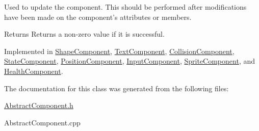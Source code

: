 Used to update the component. This should be performed after modifications have been made on the component's attributes or members.

\begin{DoxyReturn}{Returns}
Returns a non-\/zero value if it is successful. 
\end{DoxyReturn}


Implemented in \hyperlink{class_shape_component_ae62aa31a3d5c65c675243fdcc5f60904}{Shape\-Component}, \hyperlink{class_text_component_a0157702090c5ab75071448dfefb7196e}{Text\-Component}, \hyperlink{class_collision_component_a03f6ad68a39a5f7df79d5ed3e85a31eb}{Collision\-Component}, \hyperlink{class_state_component_a202841453e2d2bebc43079ec2da344bb}{State\-Component}, \hyperlink{class_position_component_a1c966c7291bcf3b8c8101bb70f046f7f}{Position\-Component}, \hyperlink{class_input_component_a1577c43e70f7e7f4ac6647fb4a8563fa}{Input\-Component}, \hyperlink{class_sprite_component_a3518ccb69a3c829d5dcdc2dc024447ea}{Sprite\-Component}, and \hyperlink{class_health_component_a1cec30820565ff476375715daf245ada}{Health\-Component}.



The documentation for this class was generated from the following files\-:\begin{DoxyCompactItemize}
\item 
\hyperlink{_abstract_component_8h}{Abstract\-Component.\-h}\item 
Abstract\-Component.\-cpp\end{DoxyCompactItemize}
